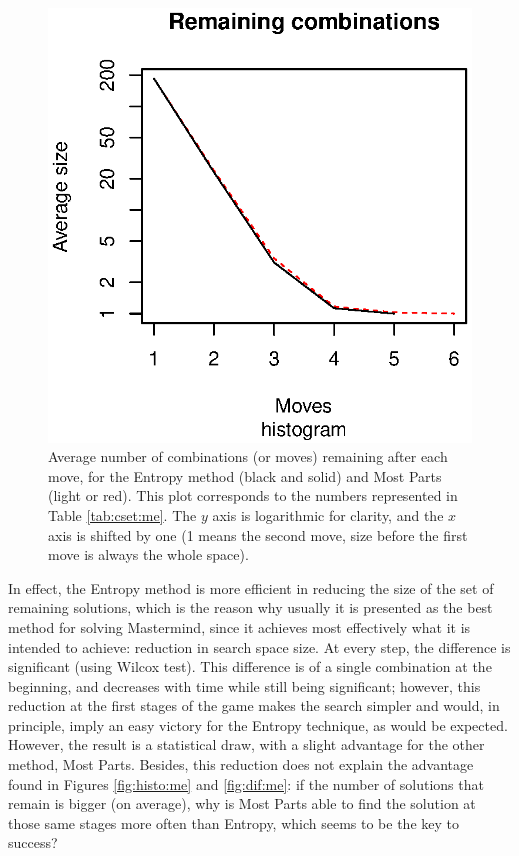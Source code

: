 \documentclass[preprint,12pt]{elsarticle}
\begin{document}
\begin{figure}[!htb]
\centering
\includegraphics{cset-me.eps}
\caption{Average number of combinations (or moves) remaining after
  each move, for the
  Entropy method (black and solid) and Most Parts (light or
  red). This plot corresponds to the numbers represented in Table
  \ref{tab:cset:me}. The $y$ axis is logarithmic for clarity, and the
  $x$ axis is shifted by one (1 means the second move, size before the
  first move is always the whole space).\label{fig:cset:me}}
\end{figure} 
In effect, the Entropy method is more efficient in
reducing the size of the set of remaining solutions, which is the
reason why usually it is presented as the best method for solving
Mastermind, since it achieves most effectively what it is intended to
achieve: reduction in search space size. At every step,
the difference is significant (using Wilcox test). This difference is
of a single combination at the beginning, and decreases with time while
still being significant; however, this reduction at the first stages
of the game makes the search simpler and would, in principle, imply an
easy victory for the Entropy technique, as would be expected. However, the
result is a statistical draw, 
with a slight advantage for the other
method, Most Parts. Besides, this reduction does not explain the
advantage found in Figures \ref{fig:histo:me} and \ref{fig:dif:me}: if the number of
solutions that remain is bigger (on average), why is Most Parts able
to find the solution at those same stages more often than Entropy,
which seems to be the key to success?
\end{document}

